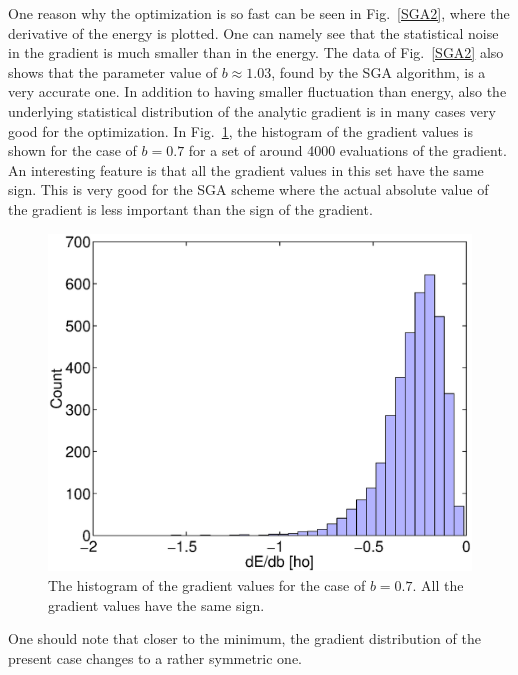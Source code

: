 \documentclass{article}
\begin{document}
One reason why the optimization is so fast can be seen in
Fig.~\ref{SGA2}, where the derivative of the energy is plotted. One
can namely see that the statistical noise in the gradient is much
smaller than in the energy. The data of Fig.~\ref{SGA2} also shows
that the parameter value of $b\approx 1.03$, found by the SGA
algorithm, is a very accurate one. In addition to having smaller
fluctuation than energy, also the underlying statistical distribution
of the analytic gradient is in many cases very good for the
optimization.  In Fig.~\ref{SGA3}, the histogram of the gradient
values is shown for the case of $b=0.7$ for a set of around 4000
evaluations of the gradient. An interesting feature is that all the
gradient values in this set have the same sign. This is very good for
the SGA scheme where the actual absolute value of the gradient is less
important than the sign of the gradient.
%
\begin{figure}[hbt] 
\begin{center}
 \includegraphics[width=0.9\columnwidth]{Hist.eps}
\caption{The histogram of the gradient values for the case of
$b=0.7$. All the gradient values have the same sign.}
\label{SGA3}
\end{center}
\end{figure}
%
One should note that closer to the minimum, the gradient distribution
of the present case changes to a rather symmetric one.
\end{document}
